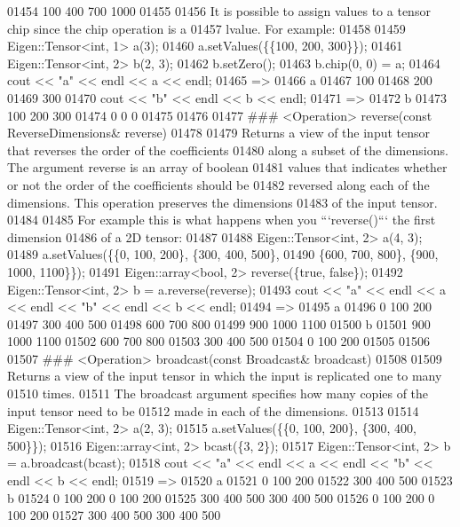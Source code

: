 \begin{DoxyCode}
01454        100   400   700    1000
01455 
01456 It is possible to assign values to a tensor chip since the chip operation is a
01457 lvalue. For example:
01458 
01459     Eigen::Tensor<int, 1> a(3);
01460     a.setValues(\{\{100, 200, 300\}\});
01461     Eigen::Tensor<int, 2> b(2, 3);
01462     b.setZero();
01463     b.chip(0, 0) = a;
01464     cout << "a" << endl << a << endl;
01465     =>
01466     a
01467      100
01468      200
01469      300
01470     cout << "b" << endl << b << endl;
01471     =>
01472     b
01473        100   200   300
01474          0     0     0
01475 
01476 
01477 ### <Operation> reverse(const ReverseDimensions& reverse)
01478 
01479 Returns a view of the input tensor that reverses the order of the coefficients
01480 along a subset of the dimensions.  The argument reverse is an array of boolean
01481 values that indicates whether or not the order of the coefficients should be
01482 reversed along each of the dimensions.  This operation preserves the dimensions
01483 of the input tensor.
01484 
01485 For example this is what happens when you ```reverse()``` the first dimension
01486 of a 2D tensor:
01487 
01488     Eigen::Tensor<int, 2> a(4, 3);
01489     a.setValues(\{\{0, 100, 200\}, \{300, 400, 500\},
01490                 \{600, 700, 800\}, \{900, 1000, 1100\}\});
01491     Eigen::array<bool, 2> reverse(\{true, false\});
01492     Eigen::Tensor<int, 2> b = a.reverse(reverse);
01493     cout << "a" << endl << a << endl << "b" << endl << b << endl;
01494     =>
01495     a
01496        0   100   200
01497      300   400   500
01498      600   700   800
01499      900  1000  1100
01500     b
01501      900  1000  1100
01502      600   700   800
01503      300   400   500
01504        0   100   200
01505 
01506 
01507 ### <Operation> broadcast(const Broadcast& broadcast)
01508 
01509 Returns a view of the input tensor in which the input is replicated one to many
01510 times.
01511 The broadcast argument specifies how many copies of the input tensor need to be
01512 made in each of the dimensions.
01513 
01514     Eigen::Tensor<int, 2> a(2, 3);
01515     a.setValues(\{\{0, 100, 200\}, \{300, 400, 500\}\});
01516     Eigen::array<int, 2> bcast(\{3, 2\});
01517     Eigen::Tensor<int, 2> b = a.broadcast(bcast);
01518     cout << "a" << endl << a << endl << "b" << endl << b << endl;
01519     =>
01520     a
01521        0   100   200
01522      300   400   500
01523     b
01524        0   100   200    0   100   200
01525      300   400   500  300   400   500
01526        0   100   200    0   100   200
01527      300   400   500  300   400   500

\end{DoxyCode}
